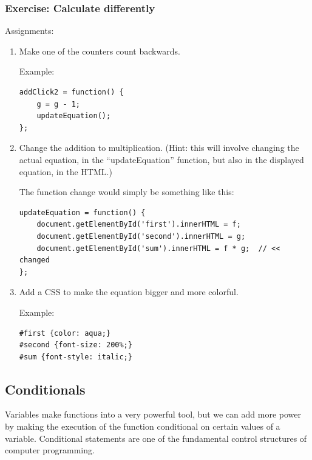 \documentclass[11pt]{article}
\begin{document}
\subsubsection{Exercise: Calculate differently}

Assignments:

\begin{enumerate}

\item Make one of the counters count backwards.

Example:

\begin{verbatim}
addClick2 = function() {
    g = g - 1;
    updateEquation();
};
\end{verbatim}

\item Change the addition to multiplication. (Hint: this will involve
  changing the actual equation, in the ``updateEquation'' function,
  but also in the displayed equation, in the HTML.)

The function change would simply be something like this:

\begin{verbatim}
updateEquation = function() {
    document.getElementById('first').innerHTML = f;
    document.getElementById('second').innerHTML = g;
    document.getElementById('sum').innerHTML = f * g;  // << changed
};
\end{verbatim}


\item Add a CSS to make the equation bigger and more colorful.

Example:

\begin{verbatim}
#first {color: aqua;}
#second {font-size: 200%;}
#sum {font-style: italic;}
\end{verbatim}

\end{enumerate}


\subsection{Conditionals}

Variables make functions into a very powerful tool, but we can add
more power by making the execution of the function conditional on
certain values of a variable.  Conditional statements are one of the
fundamental control structures of computer programming.
\end{document}
